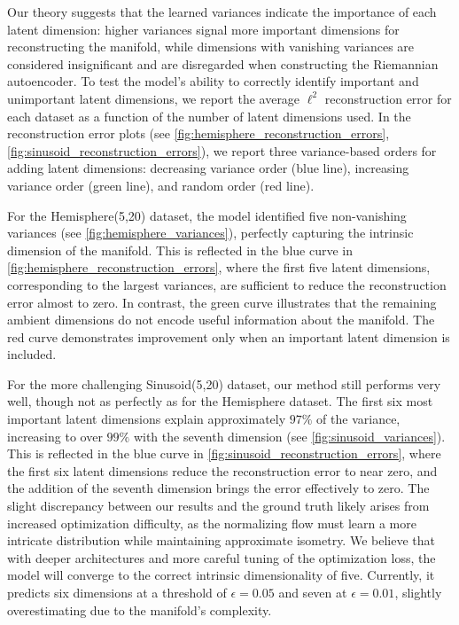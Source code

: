     Our theory suggests that the learned variances indicate the importance of each latent dimension: higher variances signal more important dimensions for reconstructing the manifold, while dimensions with vanishing variances are considered insignificant and are disregarded when constructing the Riemannian autoencoder. To test the model's ability to correctly identify important and unimportant latent dimensions, we report the average $\ell^2$ reconstruction error for each dataset as a function of the number of latent dimensions used. In the reconstruction error plots (see \ref{fig:hemisphere_reconstruction_errors},\ref{fig:sinusoid_reconstruction_errors}), we report three variance-based orders for adding latent dimensions: decreasing variance order (blue line), increasing variance order (green line), and random order (red line).
    
    For the Hemisphere(5,20) dataset, the model identified five non-vanishing variances (see \ref{fig:hemisphere_variances}), perfectly capturing the intrinsic dimension of the manifold. This is reflected in the blue curve in \ref{fig:hemisphere_reconstruction_errors}, where the first five latent dimensions, corresponding to the largest variances, are sufficient to reduce the reconstruction error almost to zero. In contrast, the green curve illustrates that the remaining ambient dimensions do not encode useful information about the manifold. The red curve demonstrates improvement only when an important latent dimension is included.
    
    For the more challenging Sinusoid(5,20) dataset, our method still performs very well, though not as perfectly as for the Hemisphere dataset. The first six most important latent dimensions explain approximately $97\%$ of the variance, increasing to over $99\%$ with the seventh dimension (see \ref{fig:sinusoid_variances}). This is reflected in the blue curve in \ref{fig:sinusoid_reconstruction_errors}, where the first six latent dimensions reduce the reconstruction error to near zero, and the addition of the seventh dimension brings the error effectively to zero. The slight discrepancy between our results and the ground truth likely arises from increased optimization difficulty, as the normalizing flow must learn a more intricate distribution while maintaining approximate isometry. We believe that with deeper architectures and more careful tuning of the optimization loss, the model will converge to the correct intrinsic dimensionality of five. Currently, it predicts six dimensions at a threshold of $\epsilon = 0.05$ and seven at $\epsilon = 0.01$, slightly overestimating due to the manifold's complexity.
    
